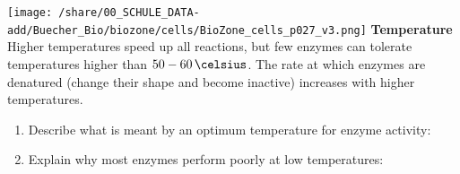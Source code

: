 \begin{enumerate}[itemsep=1.5em, leftmargin=*]
\hspace{-3cm}
\begin{minipage}{15cm}
\begin{multicols*}{2}
		\texttt{[image: /share/00\_SCHULE\_DATA-add/Buecher\_Bio/biozone/cells/BioZone\_cells\_p027\_v3.png]}
	\vfill\null
	\columnbreak
			 \textbf{Temperature}\\
			 Higher temperatures speed up all reactions, but few enzymes can tolerate temperatures higher than $50 - 60\,\celsius$. The rate at which enzymes are denatured (change their shape and become inactive) increases with higher temperatures.
	 		\begin{enumerate}[label=\textit{(\arabic*)},leftmargin=0em,series=zaehler]
		      \item 
		       Describe what is meant by an optimum temperature for enzyme activity:
		      \item  Explain why most enzymes perform poorly at low temperatures:
		      \end{enumerate}
	\end{multicols*}
\end{minipage}


\end{enumerate}
